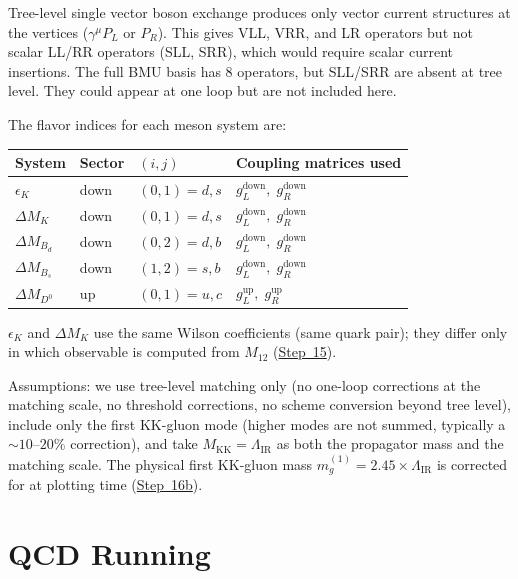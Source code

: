 \documentclass[11pt]{article}
\newcommand{\Mkk}{M_{\mathrm{KK}}}
\newcommand{\LamIR}{\Lambda_{\mathrm{IR}}}
\begin{document}
Tree-level single vector boson exchange
produces only vector current structures at the vertices ($\gamma^\mu P_L$ or
$P_R$). This gives VLL, VRR, and LR operators but not scalar LL/RR operators
(SLL, SRR), which would require scalar current insertions.  The full BMU basis
has 8 operators, but SLL/SRR are absent at tree level.  They could appear at
one loop but are not included here.

The flavor indices for each meson system are:

\begin{table}[h]
\centering
\begin{tabular}{@{}llll@{}}
\toprule
System & Sector & $(i,j)$ & Coupling matrices used \\
\midrule
$\epsilon_K$ & down & $(0,1) = d,s$ &
  $g_L^{\mathrm{down}},\; g_R^{\mathrm{down}}$ \\
$\Delta M_K$ & down & $(0,1) = d,s$ &
  $g_L^{\mathrm{down}},\; g_R^{\mathrm{down}}$ \\
$\Delta M_{B_d}$ & down & $(0,2) = d,b$ &
  $g_L^{\mathrm{down}},\; g_R^{\mathrm{down}}$ \\
$\Delta M_{B_s}$ & down & $(1,2) = s,b$ &
  $g_L^{\mathrm{down}},\; g_R^{\mathrm{down}}$ \\
$\Delta M_{D^0}$ & up & $(0,1) = u,c$ &
  $g_L^{\mathrm{up}},\; g_R^{\mathrm{up}}$ \\
\bottomrule
\end{tabular}
\end{table}

$\epsilon_K$ and $\Delta M_K$ use the same Wilson coefficients (same quark
pair); they differ only in which observable is computed from $M_{12}$
(\hyperref[sec:step15]{Step~15}).

Assumptions: we use tree-level matching only (no one-loop corrections at the
matching scale, no threshold corrections, no scheme conversion beyond tree
level), include only the first KK-gluon mode (higher modes are not summed,
typically a $\sim 10$--$20\%$ correction), and take $\Mkk = \LamIR$ as both
the propagator mass and the matching scale. The physical first KK-gluon mass
$m_g^{(1)} = 2.45\times\LamIR$ is corrected for at plotting time
(\hyperref[sec:step16b]{Step~16b}).

\section{QCD Running}
\label{sec:step13}
\end{document}
